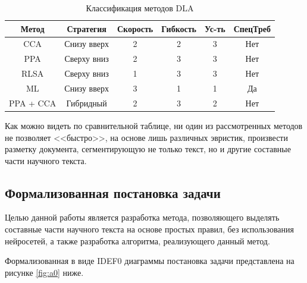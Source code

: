 \begin{table}[H]
    \centering
    \caption{Классификация методов DLA}
    \label{tab:table}
    \begin{tabular}{|c|c|c|c|c|c|}
        \hline
        \textbf{Метод} & \textbf{Стратегия} & \textbf{Скорость} & \textbf{Гибкость} & \textbf{Ус-ть} & \textbf{СпецТреб} \\ \hline
        CCA        & Снизу вверх & 2 & 2 & 3 & Нет \\ \hline
        PPA        & Сверху вниз & 2 & 3 & 3 & Нет \\ \hline
        RLSA       & Сверху вниз & 1 & 3 & 3 & Нет \\ \hline
        ML         & Снизу вверх & 3 & 1 & 1 & Да \\ \hline
        PPA + CCA  & Гибридный   & 2 & 3 & 2 & Нет \\ \hline
    \end{tabular}
\end{table}

Как можно видеть по сравнительной таблице, ни один из рассмотренных методов не позволяет <<быстро>>, на основе лишь различных эвристик, произвести разметку документа, сегментирующую не только текст, но и другие составные части научного текста.

\newpage

\subsection{Формализованная постановка задачи}


Целью данной работы является разработка метода, позволяющего выделять составные части научного текста на основе простых правил, без использования нейросетей, а также разработка алгоритма, реализующего данный метод.

Формализованная в виде IDEF0 диаграммы постановка задачи представлена на рисунке \ref{fig:a0} ниже.

